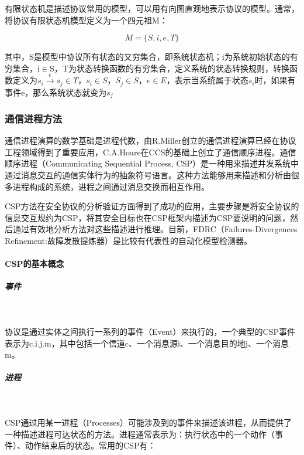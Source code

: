 \documentclass[cs4size,a4pape,UTF8]{ctexart}
\numberwithin{equation}{section}
\numberwithin{table}{section}
\numberwithin{figure}{section}
\begin{document}
有限状态机是描述协议常用的模型，可以用有向图直观地表示协议的模型。通常，将协议有限状态机模型定义为一个四元祖M：

\begin{equation}
M=\{S,i,e,T\}
\end{equation}

其中，S是模型中协议所有状态的又穷集合，即系统状态机；i为系统初始状态的有穷集合，i$\in$S，T为状态转换函数的有穷集合，定义系统的状态转换规则，转换函数定义为$s_{i}\stackrel{e}{\longrightarrow}s_{j}\in{T}，s_{i}\in{S}，S_{j}\in{S}，e\in{E}$，表示当系统属于状态$s_{i}$时，如果有事件e，那么系统状态就变为$s_{j}$

\subsubsection{通信进程方法}
通信进程演算的数学基础是进程代数，由R.Miller创立的通信进程演算已经在协议工程领域得到了重要应用，C.A.Hoare在CCS的基础上创立了通信顺序进程。通信顺序进程（Communicating Sequential Process, CSP）是一种用来描述并发系统中通过消息交互的通信实体行为的抽象符号语言。这种方法能够用来描述和分析由很多进程构成的系统，进程之间通过消息交换而相互作用。

CSP方法在安全协议的分析验证方面得到了成功的应用，主要步骤是将安全协议的信息交互规约为CSP，将其安全目标也在CSP框架内描述为CSP要说明的问题，然后通过有效地分析方法对这些描述进行推理。目前，FDRC（Failures-Divergences Refinement:故障发散提炼器）是比较有代表性的自动化模型检测器。

\paragraph{CSP的基本概念}
\subparagraph{事件}\

协议是通过实体之间执行一系列的事件（Event）来执行的，一个典型的CSP事件表示为c.i.j.m，其中包括一个信道c、一个消息源i、一个消息目的地j、一个消息m。

\subparagraph{进程}\

CSP通过用某一进程（Processes）可能涉及到的事件来描述该进程，从而提供了一种描述进程可达状态的方法。进程通常表示为：执行状态中的一个动作（事件）、动作结束后的状态。常用的CSP有：
\end{document}
